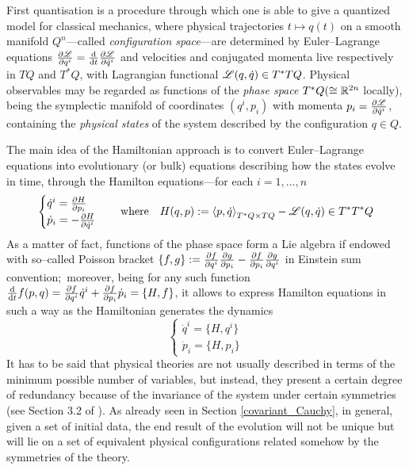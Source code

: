 First quantisation is a procedure through which one is able to give a quantized model for classical mechanics, where physical trajectories $t\mapsto q(t)$ on a smooth manifold $Q^n$---called \emph{configuration space}---are determined by Euler--Lagrange equations $\frac{\partial\mathscr{L}}{\partial q^i}=\frac{\tiny\text{\normalfont d}}{\tiny\text{\normalfont d} t}\frac{\partial\mathscr{L}}{\partial\dot{q}^i}$ and velocities and conjugated momenta live respectively in $TQ$ and $T^*Q$, with Lagrangian functional $\mathscr{L}(q,\dot{q})\in T^*TQ$.  Physical observables may be regarded as functions of the \emph{phase space} $T^*Q(\cong\mathbb{R}^{2n}$ locally), being the symplectic manifold of coordinates $(q^i,p_i)$ with momenta $p_i=\frac{\partial\mathscr{L}}{\partial\dot{q}^i}$, containing the \emph{physical states} of the system described by the configuration $q\in Q$.

The main idea of the Hamiltonian approach is to convert Euler--Lagrange equations into evolutionary (or bulk) equations describing how the states evolve in time, through the Hamilton equations---for each $i=1,\hdots,n$
$$\begin{cases}
    \dot{q}^i=\frac{\partial H}{\partial p_i}\\
    \dot{p}_i=-\frac{\partial H}{\partial\dot{q}^i}
\end{cases}\quad\text{where}\quad H(q,p):={\langle p,\dot{q} \rangle}_{T^*Q\times TQ}-\mathscr{L}(q,\dot{q})\in T^*T^*Q$$
As a matter of fact, functions of the phase space form a Lie algebra if endowed with so--called Poisson bracket $\{f,g\}:=\frac{\partial f}{\partial q^i}\frac{\partial g}{\partial p_i}-\frac{\partial f}{\partial p_i}\frac{\partial g}{\partial q^i}$ in Einstein sum convention;\, moreover, being for any such function $\frac{\tiny\text{\normalfont d}}{\tiny\text{\normalfont d} t}f(p,q)=\frac{\partial f}{\partial q^i}\dot{q}^i+\frac{\partial f}{\partial p_i}\dot{p}_i=\{H,f\}$, it allows to express Hamilton equations in such a way as the Hamiltonian generates the dynamics
$$\begin{cases}
    \dot{q}^i=\{H,q^i\}\\
    \dot{p}_i=\{H,p_i\}
    \end{cases}$$
    It has to be said that physical theories are not usually described in terms of the minimum possible number of variables, but instead, they present a certain degree of redundancy because of the invariance of the system under certain symmetries (see Section 3.2 of \cite{pullin2}). As already seen in Section \ref{covariant_Cauchy}, in general, given a set of initial data, the end result of the evolution will not be unique but will lie on a set of equivalent physical configurations related somehow by the symmetries of the theory. 
    
